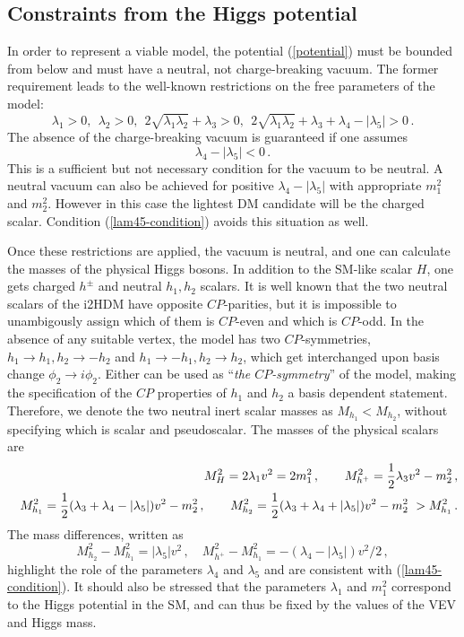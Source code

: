 
\subsection{Constraints from the Higgs potential}\label{sec:2a}

In order to represent a viable model, the potential (\ref{potential}) must be bounded from below
and must have a neutral, not charge-breaking vacuum.
The former requirement leads to the well-known restrictions on the free parameters of the model:
\begin{equation}
\lambda_1>0,\ \  \lambda_2>0,\ \ 
2\sqrt{\lambda_1\lambda_2}+\lambda_3>0,\ \ 
2\sqrt{\lambda_1\lambda_2}+\lambda_3+\lambda_4 - |\lambda_5|>0\,.
\end{equation}
The absence of the charge-breaking vacuum is guaranteed if one assumes
\begin{equation}
\lambda_4 - |\lambda_5| < 0\,. \label{lam45-condition}
\end{equation}
This is a sufficient but not necessary condition for the vacuum to be neutral.
A neutral vacuum can also be achieved for positive $\lambda_4 - |\lambda_5|$ with appropriate
$m_1^2$ and $m_2^2$. However in this case the lightest DM candidate will be the charged scalar.
Condition (\ref{lam45-condition}) avoids this situation as well.

Once these restrictions are applied, the vacuum is neutral, and one can calculate the masses of the physical Higgs bosons.
In addition to the SM-like scalar $H$, one gets charged $h^\pm$ and neutral $h_1, h_2$ scalars. 
It is well known that the two neutral scalars of the i2HDM have opposite $CP$-parities, but it is impossible 
to unambigously assign which of them is $CP$-even and which is $CP$-odd.
In the absence of any suitable vertex, the model has two $CP$-symmetries, $h_1 \to h_1, h_2 \to -h_2$ and
$h_1 \to -h_1, h_2 \to h_2$, which get interchanged upon basis change $\phi_2 \to i \phi_2$. 
Either can be used as ``\textit{the $CP$-symmetry}'' of the model, 
making the specification of the $CP$ properties of $h_1$ and $h_2$ a basis dependent statement. 
Therefore, we denote the two neutral inert scalar masses as $M_{h_1} < M_{h_2}$, without specifying which is scalar and pseudoscalar.
The masses of the physical scalars are 
\begin{eqnarray}
&&M_H^2 = 2 \lambda_1 v^2 = 2m_1^2\,,\qquad
M_{h^+}^2 = {1\over 2} \lambda_3 v^2 - m_2^2\,,\nonumber\\
&&M_{h_1}^2 = {1\over 2}(\lambda_3 +\lambda_4 - |\lambda_5|) v^2 - m_2^2\,,\qquad
M_{h_2}^2 = {1\over 2}(\lambda_3 +\lambda_4 + |\lambda_5|) v^2 - m_2^2 \ >M_{h_1}^2\,.\label{masses}
\end{eqnarray}
The mass differences, written as
\begin{equation}
M_{h_2}^2 - M_{h_1}^2 = |\lambda_5| v^2\,,\quad 
M_{h^+}^2 - M_{h_1}^2 = -(\lambda_4 - |\lambda_5|) v^2/2\,,
\end{equation}
highlight the role of the parameters $\lambda_4$ and $\lambda_5$ and are consistent with (\ref{lam45-condition}).
It should also be stressed that the parameters $\lambda_1$ and $m_1^2$ correspond to the Higgs potential in the SM, and can thus be fixed by the values of the VEV and Higgs mass.

